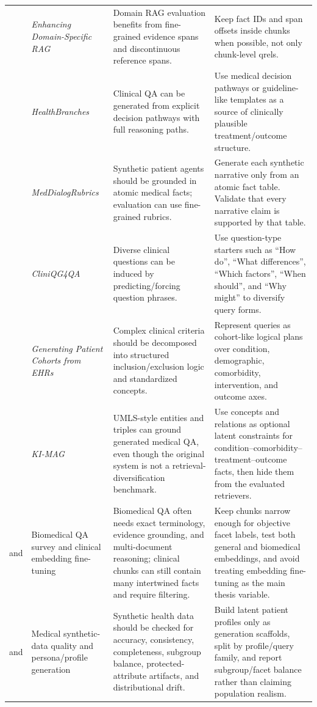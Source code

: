 \documentclass[11pt,a4paper]{article}
\begin{document}
\begin{longtable}{@{}p{2.25cm}p{3.65cm}p{4.2cm}p{4.6cm}@{}}
	\citet{jadon2025domainspecific} & \emph{Enhancing Domain-Specific RAG} & Domain RAG evaluation benefits from fine-grained evidence spans and discontinuous reference spans. & Keep fact IDs and span offsets inside chunks when possible, not only chunk-level qrels.\\
	\citet{cosentino2025healthbranches} & \emph{HealthBranches} & Clinical QA can be generated from explicit decision pathways with full reasoning paths. & Use medical decision pathways or guideline-like templates as a source of clinically plausible treatment/outcome structure.\\
	\citet{gong2026meddialogrubrics} & \emph{MedDialogRubrics} & Synthetic patient agents should be grounded in atomic medical facts; evaluation can use fine-grained rubrics. & Generate each synthetic narrative only from an atomic fact table. Validate that every narrative claim is supported by that table.\\
	\citet{yue2021cliniqg4qa} & \emph{CliniQG4QA} & Diverse clinical questions can be induced by predicting/forcing question phrases. & Use question-type starters such as ``How do'', ``What differences'', ``Which factors'', ``When should'', and ``Why might'' to diversify query forms.\\
	\citet{ziletti2025cohorts} & \emph{Generating Patient Cohorts from EHRs} & Complex clinical criteria should be decomposed into structured inclusion/exclusion logic and standardized concepts. & Represent queries as cohort-like logical plans over condition, demographic, comorbidity, intervention, and outcome axes.\\
	\citet{zafar2024kimag} & \emph{KI-MAG} & UMLS-style entities and triples can ground generated medical QA, even though the original system is not a retrieval-diversification benchmark. & Use concepts and relations as optional latent constraints for condition--comorbidity--treatment--outcome facts, then hide them from the evaluated retrievers.\\
	\citet{jin2022biomedicalqa} and \citet{arzideh2026clinicalembeddings} & Biomedical QA survey and clinical embedding fine-tuning & Biomedical QA often needs exact terminology, evidence grounding, and multi-document reasoning; clinical chunks can still contain many intertwined facts and require filtering. & Keep chunks narrow enough for objective facet labels, test both general and biomedical embeddings, and avoid treating embedding fine-tuning as the main thesis variable.\\
	\citet{qureshi2026quality} and \citet{villarreal2026healthsurveys} & Medical synthetic-data quality and persona/profile generation & Synthetic health data should be checked for accuracy, consistency, completeness, subgroup balance, protected-attribute artifacts, and distributional drift. & Build latent patient profiles only as generation scaffolds, split by profile/query family, and report subgroup/facet balance rather than claiming population realism.\\

\end{longtable}
\end{document}
